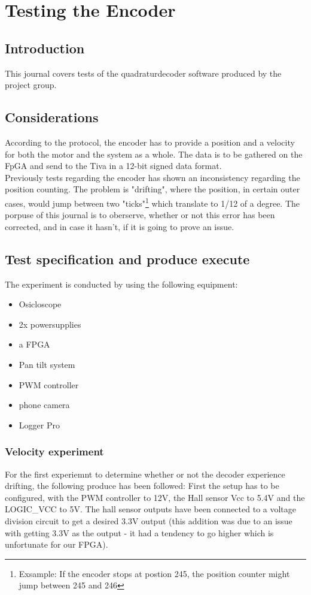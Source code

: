 \documentclass[../main]{subfiles}
\begin{document}
\section*{Testing the Encoder}

\subsection*{Introduction}
This journal covers tests of the quadraturdecoder software produced by the project group.
\subsection*{Considerations}
According to the protocol, the encoder has to provide a position and a velocity for both the motor and the system as a whole. The data is to be gathered on the FpGA and send to the Tiva in a  12-bit signed data format.
\\
Previously tests regarding the encoder has shown an inconsistency regarding the position counting. The problem is  "drifting", where the position, in certain outer cases, would jump between two "ticks"\footnote{Exsample: If the encoder stops at postion 245, the position counter might jump between 245 and 246} which translate to 1/12 of a degree. The porpuse of this journal is to oberserve, whether or not this error has been corrected, and in case it hasn't, if it is going to prove an issue.

\subsection*{Test specification and produce execute}
The experiment is conducted by using the following equipment:
\begin{itemize}
  \item Osicloscope
  \item 2x powersupplies
  \item a FPGA
  \item Pan tilt system
  \item PWM controller
  \item phone camera
  \item Logger Pro
\end{itemize}

\subsubsection*{Velocity experiment}
For the first experiemnt to determine whether or not the decoder experience drifting, the following produce has been followed:
First the setup has to be configured, with the PWM controller to 12V, the Hall sensor Vcc to 5.4V and the LOGIC\_VCC to 5V. The hall sensor outputs have been connected to a voltage division circuit to get a desired 3.3V output (this addition was due to an issue with getting 3.3V as the output - it had a tendency to go higher which is unfortunate for our FPGA).
\end{document}
